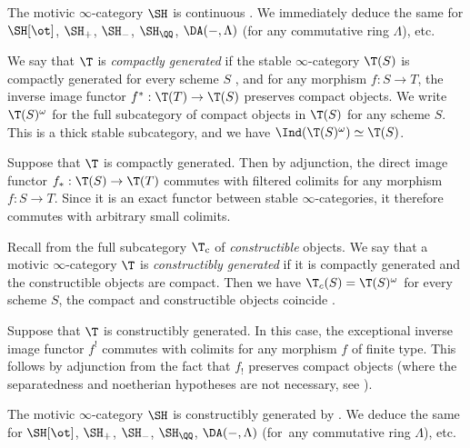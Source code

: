 \begin{ex}\label{ex:continuous}
The motivic $\infty$-category $\SH$ is continuous \cite[Prop.\,C.12(4)]{HoyoisLefschetz}.
We immediately deduce the same for $\SH[\ot]$, $\SH_+$, $\SH_-$, $\SH_\QQ$, $\DA(-,\Lambda)$ (for any commutative ring $\Lambda$), etc.
\end{ex}

\begin{df}
We say that $\T$ is \emph{compactly generated} if the stable $\infty$-category $\T(S)$ is compactly generated for every scheme $S$ \cite[Def.\,5.5.7.1]{LurieHTT}, and for any morphism $f : S \to T$, the inverse image functor $f^* : \T(T) \to \T(S)$ preserves compact objects.
We write $\T(S)^\omega$ for the full subcategory of compact objects in $\T(S)$ for any scheme $S$.
This is a thick stable subcategory, and we have $\Ind(\T(S)^\omega) \simeq \T(S)$.
\end{df}

\begin{rem}\label{rem:f_* colimits}
Suppose that $\T$ is compactly generated.
Then by adjunction, the direct image functor $f_* : \T(S) \to \T(T)$ commutes with filtered colimits for any morphism $f : S \to T$.
Since it is an exact functor between stable $\infty$-categories, it therefore commutes with arbitrary small colimits.
\end{rem}

\begin{df}\label{df:constructibly generated}
Recall from \cite[Def.\,4.2.1]{CD3} the full subcategory $\T_{\mathrm{c}}$ of \emph{constructible} objects.
We say that a motivic $\infty$-category $\T$ is \emph{constructibly generated} if it is compactly generated and the constructible objects are compact.
Then we have $\T_c(S) = \T(S)^\omega$ for every scheme $S$, \ie the compact and constructible objects coincide \cite[Prop.\,1.4.11]{CD3}.
\end{df}

\begin{rem}\label{rem:f_! constructibles}
Suppose that $\T$ is constructibly generated.
In this case, the exceptional inverse image functor $f^!$ commutes with colimits for any morphism $f$ of finite type.
This follows by adjunction from the fact that $f_!$ preserves compact objects \cite[Cor.\,4.2.12]{CD3} (where the separatedness and noetherian hypotheses are not necessary, see \cite[Cor.\,2.62]{KhanSix}).
\end{rem}

\begin{ex}
The motivic $\infty$-category $\SH$ is constructibly generated by \cite[Prop.\,C.12(1-3)]{HoyoisLefschetz}.
We deduce the same for $\SH[\ot]$, $\SH_+$, $\SH_-$, $\SH_\QQ$, $\DA(-,\Lambda)$ (for~any commutative ring $\Lambda$), etc.
\end{ex}

